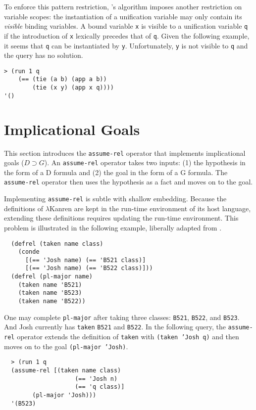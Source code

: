 \documentclass[acmlarge,review]{acmart}
\theoremstyle{definition}
\begin{document}
To enforce this pattern restriction, \citet{miller_logic_1991}'s algorithm
imposes another restriction on variable scopes: the instantiation of a
unification variable may only contain its \emph{visible} binding variables.
A bound variable \texttt{x} is visible to a unification variable \texttt{q} if
the introduction of \texttt{x} lexically precedes that of \texttt{q}.
Given the following example, it seems that \texttt{q} can be instantiated by
\texttt{y}. Unfortunately, \texttt{y} is not visible to \texttt{q} and the
query has no solution.
\begin{lstlisting}
> (run 1 q
    (== (tie (a b) (app a b))
        (tie (x y) (app x q))))
'()
\end{lstlisting}

\section{Implicational Goals}
This section introduces the \texttt{assume-rel} operator that implements
implicational goals ($D \supset G$).
An \texttt{assume-rel} operator takes two inputs: (1) the hypothesis in
the form of a D formula and (2) the goal in the form of a G formula.
The \texttt{assume-rel} operator then uses the hypothesis as a fact and
moves on to the goal.

Implementing \texttt{assume-rel} is subtle with shallow embedding.
Because the definitions of $\lambda$Kanren are kept in the run-time environment
of its host language, extending these definitions requires updating
the run-time environment. This problem is illustrated in the following
example, liberally adapted from \citet[p.~80]{miller_programming_2012}.

\begin{lstlisting}
  (defrel (taken name class)
    (conde
      [(== 'Josh name) (== 'B521 class)]
      [(== 'Josh name) (== 'B522 class)]))
  (defrel (pl-major name)
    (taken name 'B521)
    (taken name 'B523)
    (taken name 'B522))
\end{lstlisting}

One may complete \texttt{pl-major} after taking three classes: \texttt{B521},
\texttt{B522}, and \texttt{B523}. And Josh currently has \texttt{taken}
\texttt{B521} and \texttt{B522}. In the following query, the \texttt{assume-rel}
operator extends the definition of \texttt{taken} with \texttt{(taken 'Josh q)}
and then moves on to the goal \texttt{(pl-major 'Josh)}.

\begin{lstlisting}
  > (run 1 q
  (assume-rel [(taken name class)
                    (== 'Josh n)
                    (== 'q class)]
        (pl-major 'Josh)))
  '(B523)
\end{lstlisting}
\end{document}
